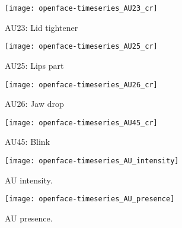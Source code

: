 \documentclass[a4paper,12pt]{article}
\begin{document}
\begin{figure}
\centering
\texttt{[image: openface-timeseries\_AU23\_cr]}
\caption{AU23: Lid tightener}
\end{figure}

\begin{figure}
\centering
\texttt{[image: openface-timeseries\_AU25\_cr]}
\caption{AU25: Lips part}
\end{figure}


\begin{figure}
\centering
\texttt{[image: openface-timeseries\_AU26\_cr]}
\caption{AU26: Jaw drop}
\end{figure}


\begin{figure}
\centering
\texttt{[image: openface-timeseries\_AU45\_cr]}
\caption{AU45: Blink}
\end{figure}


\begin{figure}
\centering
\texttt{[image: openface-timeseries\_AU\_intensity]}
\caption{AU intensity.}
\end{figure}

\begin{figure}
\centering
\texttt{[image: openface-timeseries\_AU\_presence]}
\caption{AU presence.}
\end{figure}





%
%
%
%
\end{document}
